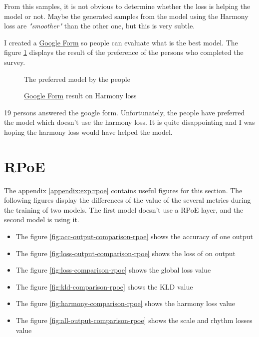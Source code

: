 \documentclass[12pt]{report}
\begin{document}
From this samples, it is not obvious to determine whether the loss is helping the model or not.
Maybe the generated samples from the model using the Harmony loss are \textit{"smoother"} than the other one, but this is very subtle.


I created a \href{https://docs.google.com/forms/d/e/1FAIpQLScZ1ZAkCxwIRiuewNlDUFgZcpEY2O-Yg0T8IEQzp4k9_BCCJg/viewform?usp=sf_link}{Google Form} so people can evaluate what is the best model.
The figure \ref{fig:pie:harmony} displays the result of the preference of the persons who completed the survey.

\begin{figure}
    \begin{center}
    \caption{\href{https://docs.google.com/forms/d/e/1FAIpQLScZ1ZAkCxwIRiuewNlDUFgZcpEY2O-Yg0T8IEQzp4k9_BCCJg/viewform?usp=sf_link}{Google Form} result on Harmony loss}
    The preferred model by the people
    \label{fig:pie:harmony}
    \end{center}
\end{figure}

19 persons answered the google form.
Unfortunately, the people have preferred the model which doesn't use the harmony loss.
It is quite disappointing and I was hoping the harmony loss would have helped the model.


\section{RPoE}
\label{sec:exp:rpoe}

The appendix \ref{appendix:exp:rpoe} contains useful figures for this section.
The following figures display the differences of the value of the several metrics during the training of two models.
The first model doesn't use a RPoE layer, and the second model is using it.
\begin{itemize}
    \item The figure \ref{fig:acc-output-comparison-rpoe} shows the accuracy of one output
    \item The figure \ref{fig:loss-output-comparison-rpoe} shows the loss of on output
    \item The figure \ref{fig:loss-comparison-rpoe} shows the global loss value
    \item The figure \ref{fig:kld-comparison-rpoe} shows the KLD value
    \item The figure \ref{fig:harmony-comparison-rpoe} shows the harmony loss value
    \item The figure \ref{fig:all-output-comparison-rpoe} shows the scale and rhythm losses value
\end{itemize}
\end{document}
